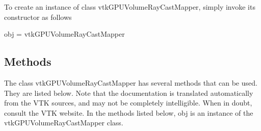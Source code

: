 To create an instance of class vtk\-G\-P\-U\-Volume\-Ray\-Cast\-Mapper, simply invoke its constructor as follows \begin{DoxyVerb}  obj = vtkGPUVolumeRayCastMapper
\end{DoxyVerb}
 \hypertarget{vtkwidgets_vtkxyplotwidget_Methods}{}\subsection{Methods}\label{vtkwidgets_vtkxyplotwidget_Methods}
The class vtk\-G\-P\-U\-Volume\-Ray\-Cast\-Mapper has several methods that can be used. They are listed below. Note that the documentation is translated automatically from the V\-T\-K sources, and may not be completely intelligible. When in doubt, consult the V\-T\-K website. In the methods listed below, {\ttfamily obj} is an instance of the vtk\-G\-P\-U\-Volume\-Ray\-Cast\-Mapper class. 
